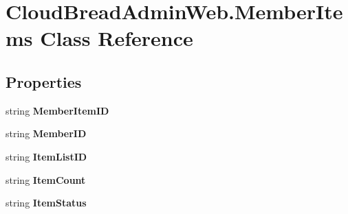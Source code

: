 \hypertarget{class_cloud_bread_admin_web_1_1_member_items}{}\section{Cloud\+Bread\+Admin\+Web.\+Member\+Items Class Reference}
\label{class_cloud_bread_admin_web_1_1_member_items}
\subsection*{Properties}
\begin{DoxyCompactItemize}
\item 
string {\bfseries Member\+Item\+ID}\hypertarget{class_cloud_bread_admin_web_1_1_member_items_a0577e57d1269b354ccfd15671401307c}{}\label{class_cloud_bread_admin_web_1_1_member_items_a0577e57d1269b354ccfd15671401307c}

\item 
string {\bfseries Member\+ID}\hypertarget{class_cloud_bread_admin_web_1_1_member_items_a7b9f6ed4f5252205b4f687bf54a6979f}{}\label{class_cloud_bread_admin_web_1_1_member_items_a7b9f6ed4f5252205b4f687bf54a6979f}

\item 
string {\bfseries Item\+List\+ID}\hypertarget{class_cloud_bread_admin_web_1_1_member_items_adb9745307d442fb1cb0e3b0415dd008d}{}\label{class_cloud_bread_admin_web_1_1_member_items_adb9745307d442fb1cb0e3b0415dd008d}

\item 
string {\bfseries Item\+Count}\hypertarget{class_cloud_bread_admin_web_1_1_member_items_a1e318c3a311cee7fb0d3fcf09006b740}{}\label{class_cloud_bread_admin_web_1_1_member_items_a1e318c3a311cee7fb0d3fcf09006b740}

\item 
string {\bfseries Item\+Status}\hypertarget{class_cloud_bread_admin_web_1_1_member_items_a7524dffb16970de18262cde85634da7e}{}\label{class_cloud_bread_admin_web_1_1_member_items_a7524dffb16970de18262cde85634da7e}


\end{DoxyCompactItemize}
